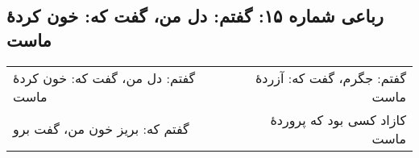 \begin{center}
\section*{رباعی شماره ۱۵: گفتم: دل من، گفت که: خون کردهٔ ماست}
\label{sec:015}
\begin{longtable}{l p{0.5cm} r}
گفتم: دل من، گفت که: خون کردهٔ ماست
&&
گفتم: جگرم، گفت که: آزردهٔ ماست
\\
گفتم که: بریز خون من، گفت برو
&&
کازاد کسی بود که پروردهٔ ماست
\\
\end{longtable}
\end{center}
